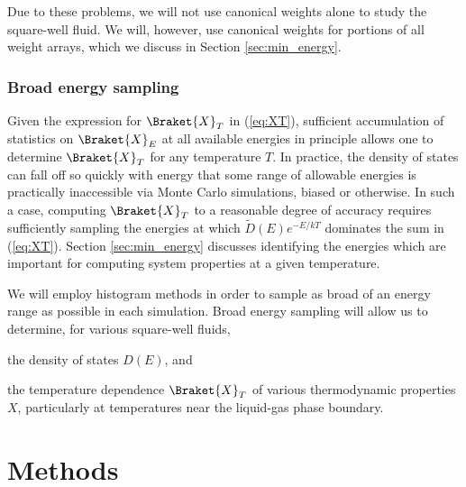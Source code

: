 \documentclass[11pt]{article}
\newcommand{\bk}{\Braket} %
\newcommand{\p}[1]{\left(#1\right)} %
\begin{document}
Due to these problems, we will not use canonical weights alone to
study the square-well fluid. We will, however, use canonical weights
for portions of all weight arrays, which we discuss in Section
\ref{sec:min_energy}.

\subsubsection{Broad energy sampling}
\label{sec:broad_energy_sampling}

Given the expression for $\bk{X}_T$ in (\ref{eq:XT}), sufficient
accumulation of statistics on $\bk{X}_E$ at all available energies in
principle allows one to determine $\bk{X}_T$ for any temperature
$T$. In practice, the density of states can fall off so quickly with
energy that some range of allowable energies is practically
inaccessible via Monte Carlo simulations, biased or otherwise. In such
a case, computing $\bk{X}_T$ to a reasonable degree of accuracy
requires sufficiently sampling the energies at which $\tilde
D\p{E}e^{-E/kT}$ dominates the sum in (\ref{eq:XT}). Section
\ref{sec:min_energy} discusses identifying the energies which are
important for computing system properties at a given temperature.

We will employ histogram methods in order to sample as broad of an
energy range as possible in each simulation. Broad energy sampling
will allow us to determine, for various square-well fluids,
\begin{enumerate*}[label=\roman*)]
\item the density of states $D\p{E}$, and
\item the temperature dependence $\bk{X}_T$ of various thermodynamic
  properties $X$, particularly at temperatures near the liquid-gas
  phase boundary.
\end{enumerate*}


\section{Methods}
\label{sec:methods}
\end{document}
